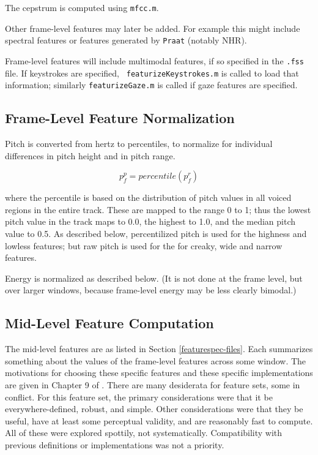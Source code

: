 \documentclass[11pt]{article}
\begin{document}
The cepstrum is computed using {\tt mfcc.m}.

Other frame-level features may later be added.  For example this might
include spectral features or features generated by {\tt Praat}
(notably NHR).

Frame-level features will include multimodal features, if so specified
in the {\tt .fss} file.  If keystrokes are specified, {\tt
  featurizeKeystrokes.m} is called to load that information; similarly
{\tt featurizeGaze.m} is called if gaze features are specified.

\subsection{Frame-Level Feature  Normalization}

Pitch is converted from hertz to percentiles, to normalize for
individual differences in pitch height and in pitch range.

\begin{equation}
p_f^p = percentile(p_f^r)
\end{equation}

where the percentile is based on the distribution of pitch values in
all voiced regions in the entire track.  These are mapped to the range
0 to 1; thus the lowest pitch value in the track maps to 0.0, the
highest to 1.0, and the median pitch value to 0.5.  As described
below, percentilized pitch is used for the highness and lowless
features; but raw pitch is used for the for creaky, wide and narrow
features.

Energy is normalized as described below. (It is not done at the frame
level, but over larger windows, because  frame-level
energy may be less clearly bimodal.)


\subsection{Mid-Level Feature Computation}   \label{other-features}

The mid-level features are as listed in Section
\ref{featurespec-files}.  Each summarizes something about the values
of the frame-level features across some window.  The motivations for
choosing these specific features and these specific implementations
are given in Chapter 9 of \cite{me-cup}.  There are many desiderata
for feature sets, some in conflict.  For this feature set, the primary
considerations were that it be everywhere-defined, robust, and simple.
Other considerations were that they be useful, have at least some
perceptual validity, and are reasonably fast to compute.  All of these
were explored spottily, not systematically.  Compatibility with
previous definitions or implementations was not a priority.
\end{document}
